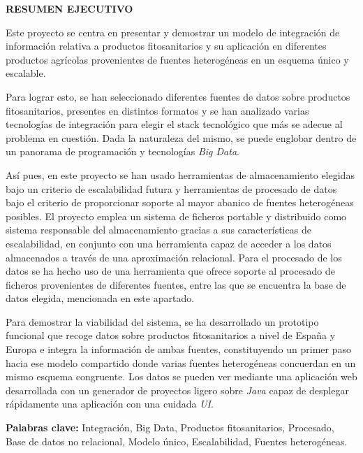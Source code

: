 \begin{center}

{\Large \bfseries RESUMEN EJECUTIVO}

\vspace{1.5cm}
\end{center}


Este proyecto se centra en presentar y demostrar un modelo de integración de información relativa a productos fitosanitarios y su aplicación en diferentes productos agrícolas provenientes de fuentes heterogéneas en un esquema único y escalable. \par
Para lograr esto, se han seleccionado diferentes fuentes de datos sobre productos fitosanitarios, presentes en distintos formatos y se han analizado varias tecnologías de integración para elegir el stack tecnológico que más se adecue al problema en cuestión. Dada la naturaleza del mismo, se puede englobar dentro de un panorama de programación y tecnologías \textit{Big Data}.
\par
Así pues, en este proyecto se han usado herramientas de almacenamiento elegidas bajo un criterio de escalabilidad futura y herramientas de procesado de datos bajo el criterio de proporcionar soporte al mayor abanico de fuentes heterogéneas posibles. El proyecto emplea un sistema de ficheros portable y distribuido como sistema responsable del almacenamiento gracias a sus características de escalabilidad, en conjunto con una herramienta capaz de acceder a los datos almacenados a través de una aproximación relacional. Para el procesado de los datos se ha hecho uso de una herramienta que ofrece soporte al procesado de ficheros provenientes de diferentes fuentes, entre las que se encuentra la base de datos elegida, mencionada en este apartado.\par
Para demostrar la viabilidad del sistema, se ha desarrollado un prototipo funcional que recoge datos sobre productos fitosanitarios a nivel de España y Europa e integra la información de ambas fuentes, constituyendo un primer paso hacia ese modelo compartido donde varias fuentes heterogéneas concuerdan en un mismo esquema congruente. Los datos se pueden ver mediante una aplicación web desarrollada con un generador de proyectos ligero sobre \textit{Java} capaz de desplegar rápidamente una aplicación con una cuidada \textit{UI}.  \\\par

\textbf{Palabras clave:} Integración, Big Data, Productos fitosanitarios, Procesado, Base de datos no relacional, Modelo único, Escalabilidad, Fuentes heterogéneas.
